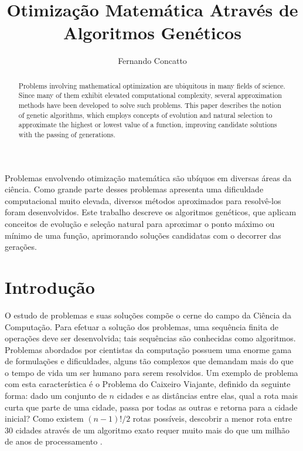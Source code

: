 \documentclass[12pt]{article}
\title{Otimização Matemática Através de Algoritmos Genéticos}
\author{Fernando Concatto\inst{1}}
\begin{document}
\maketitle

\begin{abstract}
  Problems involving mathematical optimization are ubiquitous in many fields of science. Since many of them exhibit elevated computational complexity, several approximation methods have been developed to solve such problems. This paper describes the notion of genetic algorithms, which employs concepts of evolution and natural selection to approximate the highest or lowest value of a function, improving candidate solutions with the passing of generations.
\end{abstract}

\begin{resumo}
  Problemas envolvendo otimização matemática são ubíquos em diversas áreas da ciência. Como grande parte desses problemas apresenta uma dificuldade computacional muito elevada, diversos métodos aproximados para resolvê-los foram desenvolvidos. Este trabalho descreve os algoritmos genéticos, que aplicam conceitos de evolução e seleção natural para aproximar o ponto máximo ou mínimo de uma função, aprimorando soluções candidatas com o decorrer das gerações.
\end{resumo}


\section{Introdução} \label{sec:intro}

O estudo de problemas e suas soluções compõe o cerne do campo da Ciência da Computação. Para efetuar a solução dos problemas, uma sequência finita de operações deve ser desenvolvida; tais sequências são conhecidas como algoritmos. Problemas abordados por cientistas da computação possuem uma enorme gama de formulações e dificuldades, alguns tão complexos que demandam mais do que o tempo de vida um ser humano para serem resolvidos. Um exemplo de problema com esta característica é o Problema do Caixeiro Viajante, definido da seguinte forma: dado um conjunto de $n$ cidades e as distâncias entre elas, qual a rota mais curta que parte de uma cidade, passa por todas as outras e retorna para a cidade inicial? Como existem $(n-1)!/2$ rotas possíveis, descobrir a menor rota entre 30 cidades através de um algoritmo exato requer muito mais do que um milhão de anos de processamento \cite{MacGregor2011}.
\end{document}
